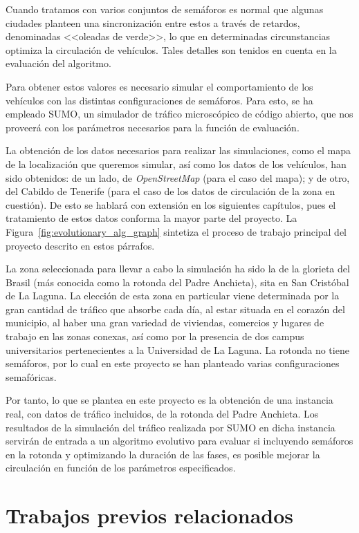 Cuando tratamos con varios conjuntos de semáforos es normal que algunas ciudades planteen una sincronización entre estos a través de retardos, denominadas <<oleadas de verde>>, lo que en determinadas circunstancias optimiza la circulación de vehículos. Tales detalles son tenidos en cuenta en la evaluación del algoritmo.

Para obtener estos valores es necesario simular el comportamiento de los vehículos con las distintas configuraciones de semáforos. Para esto, se ha empleado SUMO, un simulador de tráfico microscópico de código abierto, que nos proveerá con los parámetros necesarios para la función de evaluación.

La obtención de los datos necesarios para realizar las simulaciones, como el mapa de la localización que queremos simular, así como los datos de los vehículos, han sido obtenidos: de un lado, de \textit{OpenStreetMap} (para el caso del mapa); y de otro, del Cabildo de Tenerife (para el caso de los datos de circulación de la zona en cuestión). De esto se hablará con extensión en los siguientes capítulos, pues el tratamiento de estos datos conforma la mayor parte del proyecto. La Figura~\ref{fig:evolutionary_alg_graph} sintetiza el proceso de trabajo principal del proyecto descrito en estos párrafos.

La zona seleccionada para llevar a cabo la simulación ha sido la de la glorieta del Brasil (más conocida como la rotonda del Padre Anchieta), sita en San Cristóbal de La Laguna. La elección de esta zona en particular viene determinada por la gran cantidad de tráfico que absorbe cada día, al estar situada en el corazón del municipio, al haber una gran variedad de viviendas, comercios y lugares de trabajo en las zonas conexas, así como por la presencia de dos campus universitarios pertenecientes a la Universidad de La Laguna. La rotonda no tiene semáforos, por lo cual en este proyecto se han planteado varias configuraciones semafóricas.

Por tanto, lo que se plantea en este proyecto es la obtención de una instancia real, con datos de tráfico incluidos, de la rotonda del Padre Anchieta. Los resultados de la simulación del tráfico realizada por SUMO en dicha instancia servirán de entrada a un algoritmo evolutivo para evaluar si incluyendo semáforos en la rotonda y optimizando la duración de las fases, es posible mejorar la circulación en función de los parámetros especificados.


\section{Trabajos previos relacionados}


